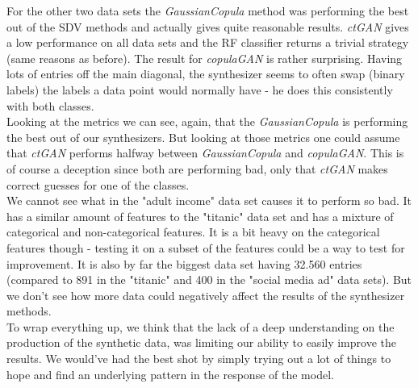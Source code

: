 \documentclass{article}
\begin{document}
For the other two data sets the \textit{GaussianCopula} method was performing the best out of the SDV methods and actually gives quite reasonable results. \textit{ctGAN} gives a low performance on all data sets and the RF classifier returns a trivial strategy (same reasons as before). The result for \textit{copulaGAN} is rather surprising. Having lots of entries off the main diagonal, the synthesizer seems to often swap (binary labels) the labels a data point would normally have - he does this consistently with both classes. \\

Looking at the metrics we can see, again, that the \textit{GaussianCopula} is performing the best out of our synthesizers. But looking at those metrics one could assume that \textit{ctGAN} performs halfway between \textit{GaussianCopula} and \textit{copulaGAN}. This is of course a deception since both are performing bad, only that \textit{ctGAN} makes correct guesses for one of the classes. \\

We cannot see what in the "adult income" data set causes it to perform so bad. It has a similar amount of features to the "titanic" data set and has a mixture of categorical and non-categorical features. It is a bit heavy on the categorical features though - testing it on a subset of the features could be a way to test for improvement. It is also by far the biggest data set having 32.560 entries (compared to 891 in the "titanic" and 400 in the "social media ad" data sets). But we don't see how more data could negatively affect the results of the synthesizer methods. \\

To wrap everything up, we think that the lack of a deep understanding on the production of the synthetic data, was limiting our ability to easily improve the results. We would've had the best shot by simply trying out a lot of things to hope and find an underlying pattern in the response of the model. 

\clearpage
{}

\end{document}
